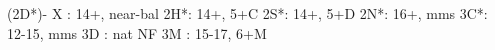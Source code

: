 (2D*)- 
X  : 14+, near-bal
2H*: 14+, 5+C
2S*: 14+, 5+D
2N*: 16+, mms
3C*: 12-15, mms
3D : nat NF
3M : 15-17, 6+M